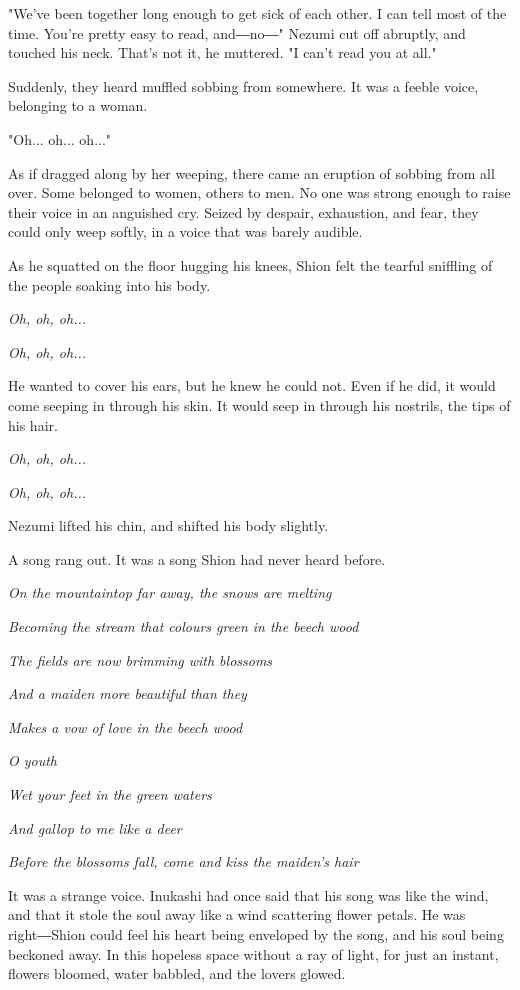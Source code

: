 "We've been together long enough to get sick of each other. I can tell
most of the time. You're pretty easy to read, and―no―" Nezumi cut off
abruptly, and touched his neck. That's not it, he muttered. "I can't
read you at all."

Suddenly, they heard muffled sobbing from somewhere. It was a feeble
voice, belonging to a woman.

"Oh... oh... oh..."

As if dragged along by her weeping, there came an eruption of sobbing
from all over. Some belonged to women, others to men. No one was strong
enough to raise their voice in an anguished cry. Seized by despair,
exhaustion, and fear, they could only weep softly, in a voice that was
barely audible.

As he squatted on the floor hugging his knees, Shion felt the tearful
sniffling of the people soaking into his body.

\emph{Oh, oh, oh...}

\emph{Oh, oh, oh...}

He wanted to cover his ears, but he knew he could not. Even if he did,
it would come seeping in through his skin. It would seep in through his
nostrils, the tips of his hair.

\emph{Oh, oh, oh...}

\emph{Oh, oh, oh...}

Nezumi lifted his chin, and shifted his body slightly.

A song rang out. It was a song Shion had never heard before.

\emph{On the mountaintop far away, the snows are melting}

\emph{Becoming the stream that colours green in the beech wood}

\emph{The fields are now brimming with blossoms}

\emph{And a maiden more beautiful than they}

\emph{Makes a vow of love in the beech wood}

\emph{O youth}

\emph{Wet your feet in the green waters}

\emph{And gallop to me like a deer}

\emph{Before the blossoms fall, come and kiss the maiden's hair}

It was a strange voice. Inukashi had once said that his song was like
the wind, and that it stole the soul away like a wind scattering flower
petals. He was right―Shion could feel his heart being enveloped by the
song, and his soul being beckoned away. In this hopeless space without a
ray of light, for just an instant, flowers bloomed, water babbled, and
the lovers glowed.

